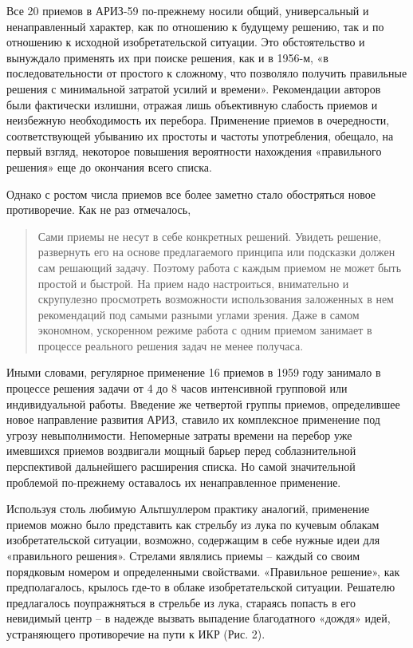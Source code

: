 \documentclass[11pt,a4paper]{article}
\begin{document}
Все 20 приемов в АРИЗ-59 по-прежнему носили общий, универсальный и
ненаправленный характер, как по отношению к будущему решению, так и по
отношению к исходной изобретательской ситуации. Это обстоятельство и вынуждало
применять их при поиске решения, как и в 1956-м, «в последовательности от
простого к сложному, что позволяло получить правильные решения с минимальной
затратой усилий и времени». Рекомендации авторов были фактически излишни,
отражая лишь объективную слабость приемов и неизбежную необходимость их
перебора. Применение приемов в очередности, соответствующей убыванию их
простоты и частоты употребления, обещало, на первый взгляд, некоторое
повышения вероятности нахождения «правильного решения» еще до окончания всего
списка.

Однако с ростом числа приемов все более заметно стало обостряться новое
противоречие. Как не раз отмечалось, 
\begin{quote}
  Сами приемы не несут в себе конкретных решений. Увидеть решение, развернуть
  его на основе предлагаемого принципа или подсказки должен сам решающий
  задачу. Поэтому работа с каждым приемом не может быть простой и быстрой. На
  прием надо настроиться, внимательно и скрупулезно просмотреть возможности
  использования заложенных в нем рекомендаций под самыми разными углами
  зрения. Даже в самом экономном, ускоренном режиме работа с одним приемом
  занимает в процессе реального решения задач не менее получаса.
  \cite{Kudryavtsev}
\end{quote}

Иными словами, регулярное применение 16 приемов в 1959 году занимало в
процессе решения задачи от 4 до 8 часов интенсивной групповой или
индивидуальной работы. Введение же четвертой группы приемов, определившее
новое направление развития АРИЗ, ставило их комплексное применение под угрозу
невыполнимости. Непомерные затраты времени на перебор уже имевшихся приемов
воздвигали мощный барьер перед соблазнительной перспективой дальнейшего
расширения списка. Но самой значительной проблемой по-прежнему оставалось их
ненаправленное применение.

Используя столь любимую Альтшуллером практику аналогий, применение приемов
можно было представить как стрельбу из лука по кучевым облакам
изобретательской ситуации, возможно, содержащим в себе нужные идеи для
«правильного решения». Стрелами являлись приемы -- каждый со своим порядковым
номером и определенными свойствами. «Правильное решение», как предполагалось,
крылось где-то в облаке изобретательской ситуации. Решателю предлагалось
поупражняться в стрельбе из лука, стараясь попасть в его невидимый центр -- в
надежде вызвать выпадение благодатного «дождя» идей, устраняющего противоречие
на пути к ИКР (Рис. 2).
\end{document}
